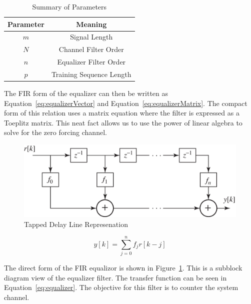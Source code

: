 \documentclass[]{article}
\begin{document}
\begin{table}[B]
\begin{center}
\begin{tabular}{|c|c|}
\hline Parameter & Meaning \\
\hline \hline
$m$ & Signal Length \\ \hline
$N$ & Channel Filter Order \\ \hline
$n$ & Equalizer Filter Order \\ \hline
$p$ & Training Sequence Length \\ \hline
\end{tabular}
\caption{Summary of Parameters} \label{tab:Paramsummary}
\end{center}
\end{table}

The FIR form of the equalizer can then be written as Equation~\ref{eq:equalizerVector} and Equation~\ref{eq:equalizerMatrix}.  The compact form of this relation uses a matrix equation where the filter is expressed as a Toeplitz matrix.  This neat fact allows us to use the power of linear algebra to solve for the zero forcing channel.  
  
 
\begin{figure}[H]
\centering
\includegraphics[width=\textwidth]{tapEqualizer.png}
\caption{Tapped Delay Line Represenation\label{fig:tap}}
\end{figure}
\begin{equation}
\label{eq:equalizer}
y\left[k\right] = \sum_{j=0}^n f_jr\left[k-j\right]
\end{equation}

The direct form of the FIR equalizor is shown in Figure~\ref{fig:tap}.  This is a subblock diagram view of the equalizer filter.  The transfer function can be seen in Equation~\ref{eq:equalizer}.  The objective for this filter is to counter the system channel.  \\
\end{document}

